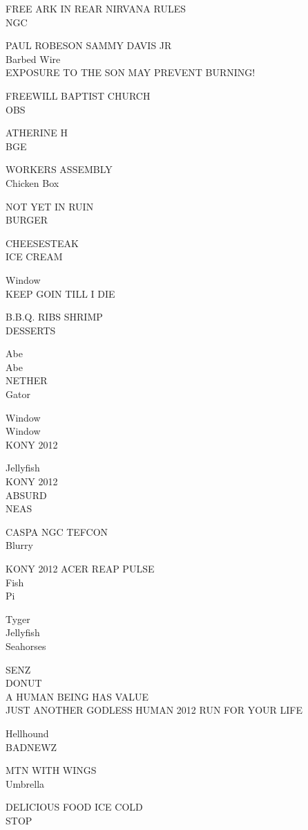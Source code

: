 \documentclass[10pt,letterpaper]{article}
\begin{document}
FREE ARK IN REAR NIRVANA RULES\\
NGC

PAUL ROBESON SAMMY DAVIS JR\\
Barbed Wire\\
EXPOSURE TO THE SON MAY PREVENT BURNING!

FREEWILL BAPTIST CHURCH\\
OBS

ATHERINE H\\
BGE

WORKERS ASSEMBLY\\
Chicken Box

NOT YET IN RUIN\\
BURGER

CHEESESTEAK\\
ICE CREAM

Window\\
KEEP GOIN TILL I DIE

B.B.Q. RIBS SHRIMP\\
DESSERTS

Abe\\
Abe\\
NETHER\\
Gator

Window\\
Window\\
KONY 2012

Jellyfish\\
KONY 2012\\
ABSURD\\
NEAS

CASPA NGC TEFCON\\
Blurry

KONY 2012 ACER REAP PULSE\\
Fish\\
Pi

Tyger\\
Jellyfish\\
Seahorses

SENZ\\
DONUT\\
A HUMAN BEING HAS VALUE\\
JUST ANOTHER GODLESS HUMAN 2012 RUN FOR YOUR LIFE

Hellhound\\
BADNEWZ

MTN WITH WINGS\\
Umbrella

DELICIOUS FOOD ICE COLD\\
STOP
\end{document}
